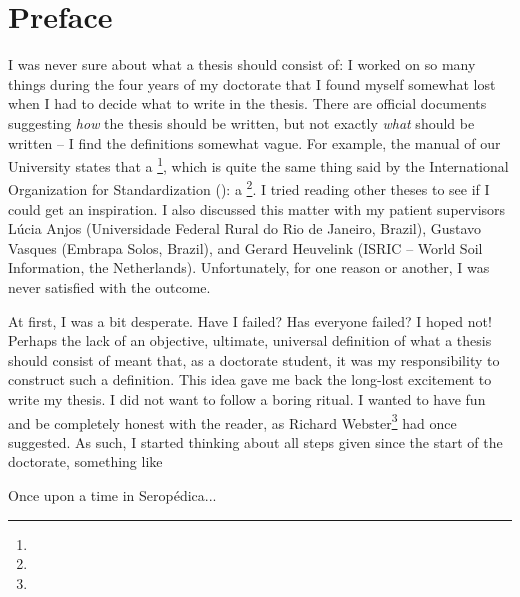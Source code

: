 \chapter*{Preface}

I was never sure about what a thesis should consist of: I worked on so many things during the four years of my 
doctorate that I found myself somewhat lost when I had to decide what to write in the thesis. There are 
official documents suggesting \emph{how} the thesis should be written, but not exactly \emph{what} should be 
written -- I find the definitions somewhat vague. For example, the manual of our University states that a 
\footnote{}, which is quite the same thing said by the International 
Organization for Standardization (\iso): a \footnote{}. I tried reading other theses to see if I could get an 
inspiration. I also discussed this matter with my patient supervisors Lúcia Anjos (Universidade Federal Rural 
do Rio de Janeiro, Brazil), Gustavo Vasques (Embrapa Solos, Brazil), and Gerard Heuvelink (ISRIC -- World Soil 
Information, the Netherlands). Unfortunately, for one reason or another, I was never satisfied with the 
outcome.

At first, I was a bit desperate. Have I failed? Has everyone failed? I hoped not! Perhaps the lack of an 
objective, ultimate, universal definition of what a thesis should consist of meant that, as a doctorate 
student, it was my responsibility to construct such a definition. This idea gave me back the long-lost 
excitement to write my thesis. I did not want to follow a boring ritual. I wanted to have fun and be completely 
honest with the reader, as Richard Webster\footnote{} had once suggested. 
As such, I started thinking about all steps given since the start of the doctorate, something like 

\vspace*{5pt}
{\calligra\Large\noindent
Once upon a time in Seropédica...
}
\vspace*{5pt}

